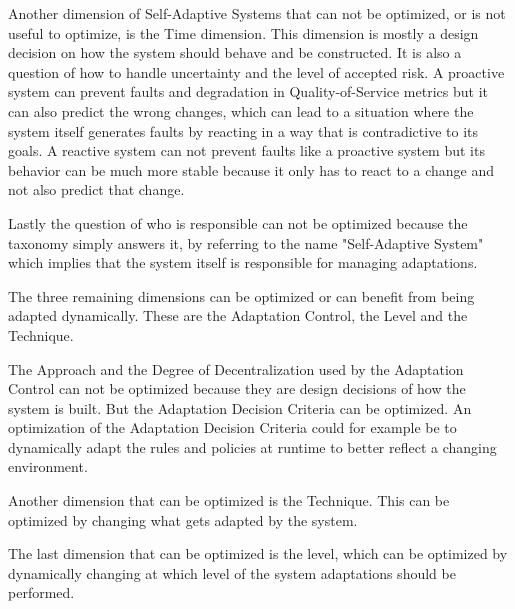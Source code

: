 Another dimension of Self-Adaptive Systems that can not be optimized, or is not useful to optimize,
is the Time dimension. This dimension is mostly a design decision on how the system should behave and be constructed.
It is also a question of how to handle uncertainty and the level of accepted risk.
A proactive system can prevent faults and degradation in Quality-of-Service metrics 
but it can also predict the wrong changes, which can lead to a situation where the system itself generates faults by
reacting in a way that is contradictive to its goals.
A reactive system can not prevent faults like a proactive system
but its behavior can be much more stable because it only has to react to a change and not also predict that change.
\newline
\par

Lastly the question of who is responsible can not be optimized because the taxonomy simply answers it,
by referring to the name "Self-Adaptive System" which implies that the system itself is responsible for managing adaptations.
\newline
\par

The three remaining dimensions can be optimized or can benefit from being adapted dynamically.
These are the Adaptation Control, the Level and the Technique.
\newline
\par

The Approach and the Degree of Decentralization used by the Adaptation Control can not be optimized 
because they are design decisions of how the system is built.
But the Adaptation Decision Criteria can be optimized. An optimization of the Adaptation Decision Criteria
could for example be to dynamically adapt the rules and policies at runtime to better reflect a changing environment.
\newline
\par

Another dimension that can be optimized is the Technique. 
This can be optimized by changing what gets adapted by the system.
\newline
\par

The last dimension that can be optimized is the level, which can be optimized by dynamically changing at which level of the system
adaptations should be performed.

